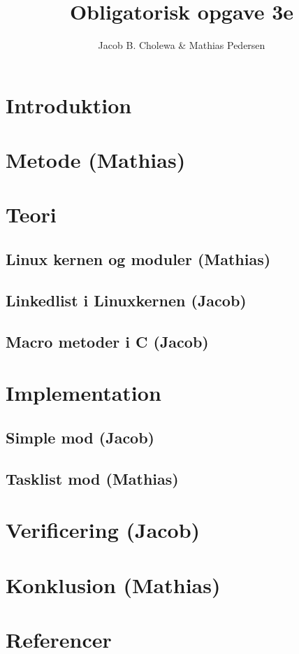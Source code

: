 \documentclass[danish]{report}
\title{Obligatorisk opgave 3e}
\author{Jacob B. Cholewa \& Mathias Pedersen }
\begin{document}
\maketitle

\chapter{Introduktion}
\chapter{Metode (Mathias)}
\chapter{Teori}
\section{Linux kernen og moduler (Mathias)}
\section{Linkedlist i Linuxkernen (Jacob)}
\section{Macro metoder i C (Jacob)}
\chapter{Implementation}
\section{Simple mod (Jacob)}
\section{Tasklist mod (Mathias)}
\chapter{Verificering (Jacob)}
\chapter{Konklusion (Mathias)}
\chapter{Referencer}
\end{document}
